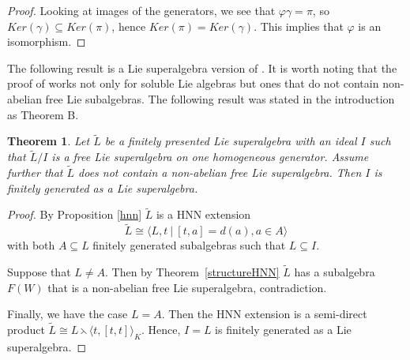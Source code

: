 \documentclass[12pt, reqno]{amsart}
\newtheorem{theorem}{Theorem}[section]
\theoremstyle{remark}
\theoremstyle{definition}
\numberwithin{equation}{section}
\begin{document}
\begin{proof}
Looking at images of the generators, we see that
$\varphi \gamma = \pi$, so  $Ker(\gamma) \subseteq Ker(\pi)$, hence $Ker(\pi) = Ker (\gamma)$. This implies that $\varphi$ is an isomorphism.
\end{proof}


 The following result is a Lie superalgebra version of \cite[Cor. 5.4]{W}. 
 It is worth noting that the proof of  \cite[Cor. 5.4]{W} works not only for soluble Lie algebras but ones that do not contain non-abelian free Lie subalgebras.  The following result was stated in the introduction as Theorem B. 


 \begin{theorem} \label{sol1} Let $\widetilde{L}$ be a finitely presented Lie superalgebra   
 with an ideal $I$
 such that $\widetilde{L}/ I$ is a free Lie superalgebra on one  homogeneous generator. Assume further that $\widetilde{L}$ does not contain 
 a non-abelian free Lie superalgebra. 
 Then $I$ is finitely generated as a Lie superalgebra.
 \end{theorem}

 \begin{proof}
 By Proposition \ref{hnn}  $\widetilde{L}$ is a HNN extension 
 $$ \widetilde L\cong \langle L, t \ | \ [t,a] = d(a) , a \in A \rangle$$ with both $A \subseteq L$ finitely generated  subalgebras  such that $L \subseteq I$.

 Suppose that $L \not= A$. 
 Then by Theorem~\ref{structureHNN} 
 $\widetilde L$ has  a subalgebra $F(W)$ that is a non-abelian free Lie superalgebra,  contradiction.
 
 Finally, we have the case $L = A$.
 Then  the HNN extension is a semi-direct product $\widetilde L\cong L \leftthreetimes \langle t, [t,t]\rangle_K$.  
 Hence, $I=L$ is finitely generated as a Lie superalgebra.

\end{proof}
\end{document}
